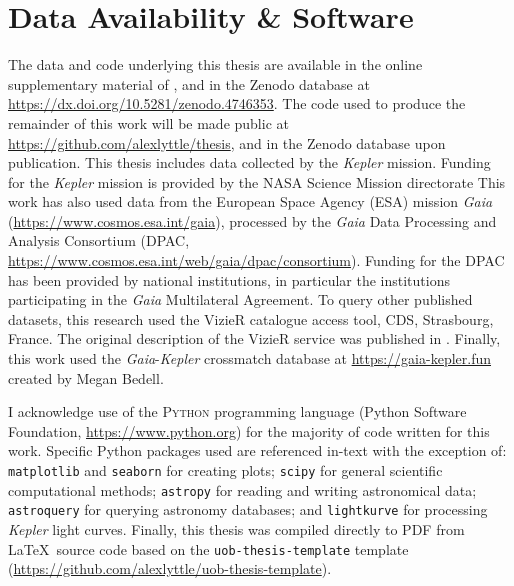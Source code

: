 \chapter*{Data Availability \& Software}

The data and code underlying this thesis are available in the online supplementary material of \citet{Lyttle.Davies.ea2021}, and in the Zenodo database at \url{https://dx.doi.org/10.5281/zenodo.4746353}. The code used to produce the remainder of this work will be made public at \url{https://github.com/alexlyttle/thesis}, and in the Zenodo database upon publication. This thesis includes data collected by the \emph{Kepler} mission. Funding for the \emph{Kepler} mission is provided by the NASA Science Mission directorate This work has also used data from the European Space Agency (ESA) mission
\emph{Gaia} (\url{https://www.cosmos.esa.int/gaia}), processed by the {\it Gaia}
Data Processing and Analysis Consortium (DPAC,
\url{https://www.cosmos.esa.int/web/gaia/dpac/consortium}). Funding for the DPAC
has been provided by national institutions, in particular the institutions
participating in the \emph{Gaia} Multilateral Agreement. To query other published datasets, this research used the VizieR catalogue access tool, CDS, Strasbourg, France. The original description of the VizieR service was published in \citet{Ochsenbein.Bauer.ea2000}. Finally, this work used the \emph{Gaia}-\emph{Kepler} crossmatch database at \url{https://gaia-kepler.fun} created by Megan Bedell.

I acknowledge use of the \textsc{Python} programming language (Python Software Foundation, \url{https://www.python.org}) for the majority of code written for this work. Specific Python packages used are referenced in-text with the exception of: \texttt{matplotlib} \citep[v3.6.2;][]{Caswell.Lee.ea2022,Hunter2007} and \texttt{seaborn} \citep{Waskom2021} for creating plots; \texttt{scipy} \citep{Virtanen.Gommers.ea2020} for general scientific computational methods; \texttt{astropy} \citep{AstropyCollaboration.Price-Whelan.ea2022} for reading and writing astronomical data; \texttt{astroquery} \citep{Ginsburg.Sipocz.ea2019} for querying astronomy databases; and \texttt{lightkurve} \citep{LightkurveCollaboration.Cardoso.ea2018} for processing \emph{Kepler} light curves. Finally, this thesis was compiled directly to PDF from \LaTeX~source code based on the \texttt{uob-thesis-template} template (\url{https://github.com/alexlyttle/uob-thesis-template}).
